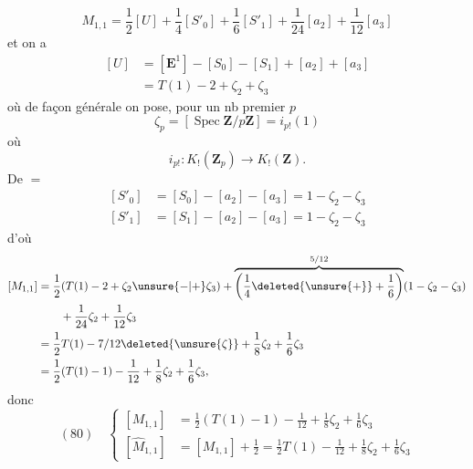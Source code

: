 \[
M_{1,1}=\frac12[U]+\frac14[S'_0]+\frac16[S'_1]+\frac1{24}[a_2]+\frac1{12}[a_3]
\]
et on a
\[
\begin{aligned}
[U]&=[\mathbf E^1]-[S_0]-[S_1]+[a_2]+[a_3]\\
&=T(1)-2+\zeta_2+\zeta_3
\end{aligned}
\]
où de façon générale on pose, pour un nb premier $p$
\[
\zeta_p=[\operatorname{Spec}\mathbf Z/p\mathbf Z]=i_{p!}(1)
\]
où
\[
i_{p!}:K_!(\mathbf Z_p)\longrightarrow K_!(\mathbf Z).
\]
De $=$
\[
\begin{aligned}
[S'_0]&=[S_0]-[a_2]-[a_3]=1-\zeta_2-\zeta_3\\
[S'_1]&=[S_1]-[a_2]-[a_3]=1-\zeta_2-\zeta_3
\end{aligned}
\]
d'où
\[
\begin{aligned}
[M_{1,1}]&=\frac12(T(1)-2+\zeta_2\unsure{-|+}\zeta_3)+\overbrace{\left(\frac14\deleted{\unsure{+}}+\frac16\right)}^{5/12}(1-\zeta_2-\zeta_3)\\
&\qquad+\frac1{24}\zeta_2+\frac1{12}\zeta_3\\
&=\frac12T(1)-7/12\deleted{\unsure{\zeta}}+\frac18\zeta_2+\frac16\zeta_3\\
&=\frac12(T(1)-1)-\frac1{12}+\frac18\zeta_2+\frac16\zeta_3,
\end{aligned}
\]
donc
\[
(80)\quad\left\{\begin{aligned}
[M_{1,1}]&=\frac12(T(1)-1)-\frac1{12}+\frac18\zeta_2+\frac16\zeta_3\\
[\widehat M_{1,1}]&=[M_{1,1}]+\frac12=\frac12T(1)-\frac1{12}+\frac18\zeta_2+\frac16\zeta_3
\end{aligned}\right.
\]
